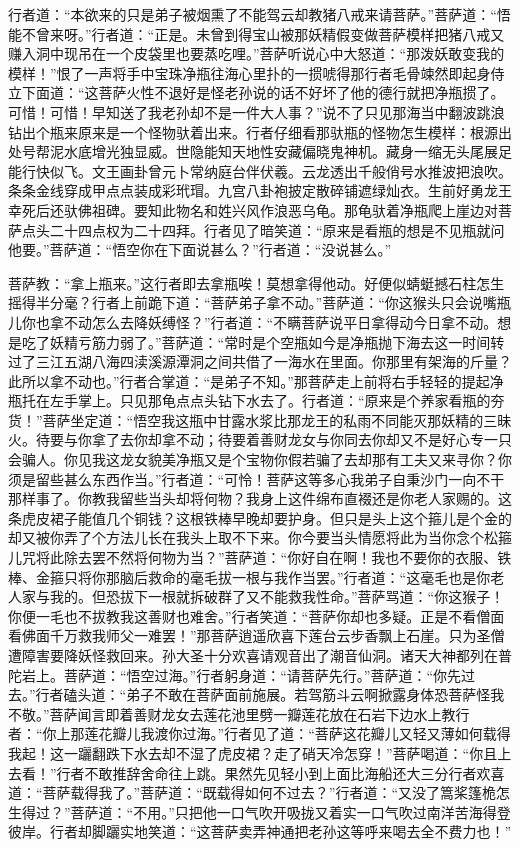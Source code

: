 \documentclass[12pt,UTF8]{ctexbook}
\begin{document}
{行者道：“本欲来的只是弟子被烟熏了不能驾云却教猪八戒来请菩萨。”菩萨道：“悟能不曾来呀。”行者道：“正是。未曾到得宝山被那妖精假变做菩萨模样把猪八戒又赚入洞中现吊在一个皮袋里也要蒸吃哩。”菩萨听说心中大怒道：“那泼妖敢变我的模样！”恨了一声将手中宝珠净瓶往海心里扑的一掼唬得那行者毛骨竦然即起身侍立下面道：“这菩萨火性不退好是怪老孙说的话不好坏了他的德行就把净瓶掼了。可惜！可惜！早知送了我老孙却不是一件大人事？”说不了只见那海当中翻波跳浪钻出个瓶来原来是一个怪物驮着出来。行者仔细看那驮瓶的怪物怎生模样：根源出处号帮泥水底增光独显威。世隐能知天地性安藏偏晓鬼神机。藏身一缩无头尾展足能行快似飞。文王画卦曾元卜常纳庭台伴伏羲。云龙透出千般俏号水推波把浪吹。条条金线穿成甲点点装成彩玳瑁。九宫八卦袍披定散碎铺遮绿灿衣。生前好勇龙王幸死后还驮佛祖碑。要知此物名和姓兴风作浪恶乌龟。那龟驮着净瓶爬上崖边对菩萨点头二十四点权为二十四拜。行者见了暗笑道：“原来是看瓶的想是不见瓶就问他要。”菩萨道：“悟空你在下面说甚么？”行者道：“没说甚么。”

菩萨教：“拿上瓶来。”这行者即去拿瓶唉！莫想拿得他动。好便似蜻蜓撼石柱怎生摇得半分毫？行者上前跪下道：“菩萨弟子拿不动。”菩萨道：“你这猴头只会说嘴瓶儿你也拿不动怎么去降妖缚怪？”行者道：“不瞒菩萨说平日拿得动今日拿不动。想是吃了妖精亏筋力弱了。”菩萨道：“常时是个空瓶如今是净瓶抛下海去这一时间转过了三江五湖八海四渎溪源潭洞之间共借了一海水在里面。你那里有架海的斤量？此所以拿不动也。”行者合掌道：“是弟子不知。”那菩萨走上前将右手轻轻的提起净瓶托在左手掌上。只见那龟点点头钻下水去了。行者道：“原来是个养家看瓶的夯货！”菩萨坐定道：“悟空我这瓶中甘露水浆比那龙王的私雨不同能灭那妖精的三昧火。待要与你拿了去你却拿不动；待要着善财龙女与你同去你却又不是好心专一只会骗人。你见我这龙女貌美净瓶又是个宝物你假若骗了去却那有工夫又来寻你？你须是留些甚么东西作当。”行者道：“可怜！菩萨这等多心我弟子自秉沙门一向不干那样事了。你教我留些当头却将何物？我身上这件绵布直裰还是你老人家赐的。这条虎皮裙子能值几个铜钱？这根铁棒早晚却要护身。但只是头上这个箍儿是个金的却又被你弄了个方法儿长在我头上取不下来。你今要当头情愿将此为当你念个松箍儿咒将此除去罢不然将何物为当？”菩萨道：“你好自在啊！我也不要你的衣服、铁棒、金箍只将你那脑后救命的毫毛拔一根与我作当罢。”行者道：“这毫毛也是你老人家与我的。但恐拔下一根就拆破群了又不能救我性命。”菩萨骂道：“你这猴子！你便一毛也不拔教我这善财也难舍。”行者笑道：“菩萨你却也多疑。正是不看僧面看佛面千万救我师父一难罢！”那菩萨逍遥欣喜下莲台云步香飘上石崖。只为圣僧遭障害要降妖怪救回来。孙大圣十分欢喜请观音出了潮音仙洞。诸天大神都列在普陀岩上。菩萨道：“悟空过海。”行者躬身道：“请菩萨先行。”菩萨道：“你先过去。”行者磕头道：“弟子不敢在菩萨面前施展。若驾筋斗云啊掀露身体恐菩萨怪我不敬。”菩萨闻言即着善财龙女去莲花池里劈一瓣莲花放在石岩下边水上教行者：“你上那莲花瓣儿我渡你过海。”行者见了道：“菩萨这花瓣儿又轻又薄如何载得我起！这一躧翻跌下水去却不湿了虎皮裙？走了硝天冷怎穿！”菩萨喝道：“你且上去看！”行者不敢推辞舍命往上跳。果然先见轻小到上面比海船还大三分行者欢喜道：“菩萨载得我了。”菩萨道：“既载得如何不过去？”行者道：“又没了篙桨篷桅怎生得过？”菩萨道：“不用。”只把他一口气吹开吸拢又着实一口气吹过南洋苦海得登彼岸。行者却脚躧实地笑道：“这菩萨卖弄神通把老孙这等呼来喝去全不费力也！”

}
\end{document}
